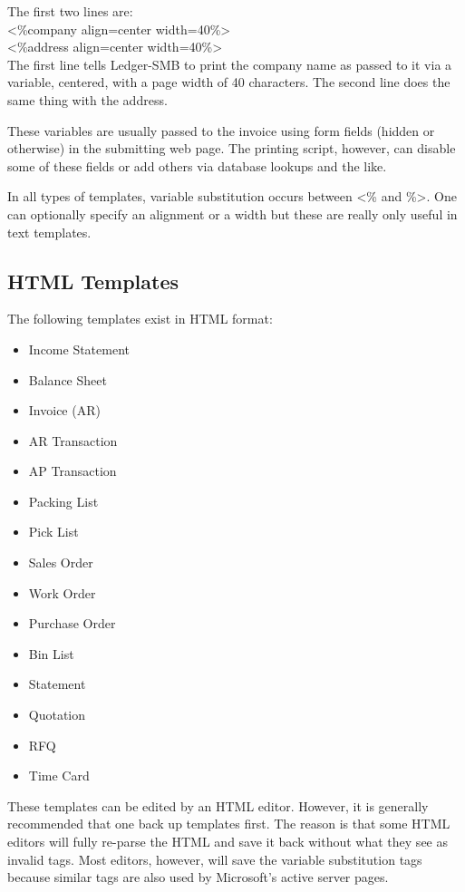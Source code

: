 \documentclass{article}
\begin{document}
The first two lines are:\\
\textless\%company align=center width=40\%\textgreater\\
\textless\%address align=center width=40\%\textgreater\\

The first line tells Ledger-SMB to print the company name as passed to it via a
variable, centered, with a page width of 40 characters.  The second line does
the same thing with the address.

These variables are usually passed to the invoice using form fields (hidden or
otherwise) in the submitting web page.  The printing script, however, can 
disable some of these fields or add others via database lookups and the like.

In all types of templates, variable substitution occurs between \textless\% and
\%\textgreater.   One can optionally specify an alignment or a width but these
are really only useful in text templates.

\subsection{HTML Templates}
The following templates exist in HTML format:

\begin{itemize}
\item Income Statement
\item Balance Sheet
\item Invoice (AR)
\item AR Transaction
\item AP Transaction
\item Packing List
\item Pick List
\item Sales Order
\item Work Order
\item Purchase Order
\item Bin List
\item Statement
\item Quotation
\item RFQ
\item Time Card
\end{itemize}

These templates can be edited by an HTML editor.  However, it is generally
recommended that one back up templates first.  The reason is that some HTML
editors will fully re-parse the HTML and save it back without what they see as
invalid tags.  Most editors, however, will save the variable substitution tags
because similar tags are also used by Microsoft's active server pages.
\end{document}
